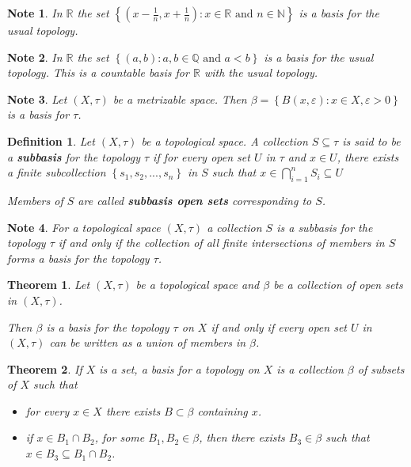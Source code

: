 \documentclass[12pt,twoside]{report}
\newtheorem{defn}{Definition}
\newtheorem{note}{Note}
\newtheorem{thm}{Theorem}
\begin{document}
\begin{note}
    In $\mathbb{R}$ the set $\left\{ \left (x - \frac{1}{n}, x + \frac{1}{n}\right )  :  x \in \mathbb{R}\text{ and }n \in \mathbb{N} \right\}$ is a basis for the usual topology.
\end{note}

\begin{note}
    In $\mathbb{R}$ the set $\left\{ \left (a, b\right )  :  a,b \in \mathbb{Q}\text{ and }a < b \right\}$ is a basis for the usual topology. This is a countable basis for $\mathbb{R}$ with the usual topology.
\end{note}

\begin{note}
    Let $\left (X, \tau\right )$ be a metrizable space. Then $\beta = \left\{ B\left (x, \varepsilon\right )  :  x \in X, \varepsilon >0 \right\}$ is a basis for $\tau$.
\end{note}

\begin{defn}
    Let $\left (X, \tau\right )$ be a topological space. A collection $S \subseteq \tau$ is said to be a \textbf{subbasis} for the topology $\tau$ if for every open set $U$ in $\tau$ and $x \in U$, there exists a finite subcollection $\left\{ s_1, s_2, ..., s_n \right\}$ in $S$ such that $x \in \displaystyle\bigcap_{i = 1}^n S_i \subseteq U$

    Members of $S$ are called \textbf{subbasis open sets} corresponding to $S$.
\end{defn}

\begin{note}
    For a topological space $\left (X, \tau\right )$ a collection $S$ is a subbasis for the topology $\tau$ if and only if the collection of all finite intersections of members in $S$ forms a basis for the topology $\tau$.
\end{note}

\begin{thm}
    Let $\left (X, \tau\right )$ be a topological space and $\beta$ be a collection of open sets in $\left (X, \tau\right )$.

    Then $\beta$ is a basis for the topology $\tau$ on $X$ if and only if every open set $U$ in $\left (X, \tau\right )$ can be written as a union of members in $\beta$.
\end{thm}

\begin{thm}
    If $X$ is a set, a basis for a topology on $X$ is a collection $\beta$ of subsets of $X$ such that 
    \begin{itemize}
        \item for every $x \in X$ there exists $B \subset \beta$ containing $x$.
        \item if $x \in B_1 \cap B_2$, for some $B_1, B_2 \in \beta$, then there exists $B_3 \in \beta$ such that $x \in B_3 \subseteq B_1 \cap B_2$.
    \end{itemize}
\end{thm}
\end{document}
